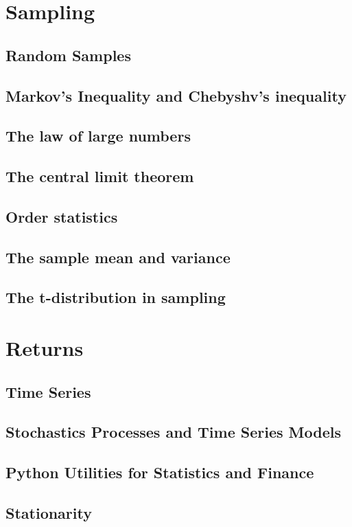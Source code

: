 \documentclass[11pt]{article}
\begin{document}
    \chapter{Sampling}

    \section{Random Samples}
    \section{Markov's Inequality and Chebyshv's inequality}
    \section{The law of large numbers}
    \section{The central limit theorem}
    \section{Order statistics}
    \section{The sample mean and variance}
    \section{The t-distribution in sampling}

    \chapter{Returns}
    \section{Time Series}
    \section{Stochastics Processes and Time Series Models}
    \section{Python Utilities for Statistics and Finance}
    \section{Stationarity}
\end{document}
